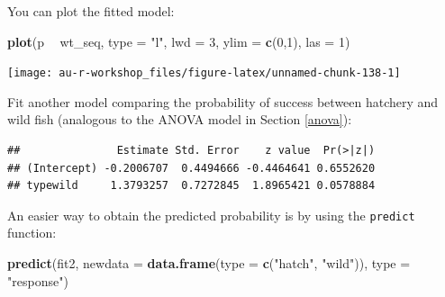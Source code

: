 \documentclass[]{book}
\newenvironment{Shaded}{\begin{snugshade}}{\end{snugshade}}
\newcommand{\KeywordTok}[1]{\textcolor[rgb]{0.13,0.29,0.53}{\textbf{#1}}}
\newcommand{\DataTypeTok}[1]{\textcolor[rgb]{0.13,0.29,0.53}{#1}}
\newcommand{\DecValTok}[1]{\textcolor[rgb]{0.00,0.00,0.81}{#1}}
\newcommand{\StringTok}[1]{\textcolor[rgb]{0.31,0.60,0.02}{#1}}
\newcommand{\OperatorTok}[1]{\textcolor[rgb]{0.81,0.36,0.00}{\textbf{#1}}}
\newcommand{\NormalTok}[1]{#1}
\theoremstyle{definition}
\theoremstyle{definition}
\theoremstyle{definition}
\theoremstyle{remark}
\begin{document}
You can plot the fitted model:

\begin{Shaded}
\begin{Highlighting}[]
\KeywordTok{plot}\NormalTok{(p }\OperatorTok{~}\StringTok{ }\NormalTok{wt_seq, }\DataTypeTok{type =} \StringTok{"l"}\NormalTok{, }\DataTypeTok{lwd =} \DecValTok{3}\NormalTok{, }\DataTypeTok{ylim =} \KeywordTok{c}\NormalTok{(}\DecValTok{0}\NormalTok{,}\DecValTok{1}\NormalTok{), }\DataTypeTok{las =} \DecValTok{1}\NormalTok{)}
\end{Highlighting}
\end{Shaded}

\begin{center}\texttt{[image: au-r-workshop\_files/figure-latex/unnamed-chunk-138-1]} \end{center}

Fit another model comparing the probability of success between hatchery
and wild fish (analogous to the ANOVA model in Section \ref{anova}):

\begin{Shaded}
\end{Shaded}

\begin{verbatim}
##               Estimate Std. Error    z value  Pr(>|z|)
## (Intercept) -0.2006707  0.4494666 -0.4464641 0.6552620
## typewild     1.3793257  0.7272845  1.8965421 0.0578884
\end{verbatim}

An easier way to obtain the predicted probability is by using the
\texttt{predict} function:

\begin{Shaded}
\begin{Highlighting}[]
\KeywordTok{predict}\NormalTok{(fit2,}
        \DataTypeTok{newdata =} \KeywordTok{data.frame}\NormalTok{(}\DataTypeTok{type =} \KeywordTok{c}\NormalTok{(}\StringTok{"hatch"}\NormalTok{, }\StringTok{"wild"}\NormalTok{)),}
        \DataTypeTok{type =} \StringTok{"response"}\NormalTok{)}
\end{Highlighting}
\end{Shaded}
\end{document}
